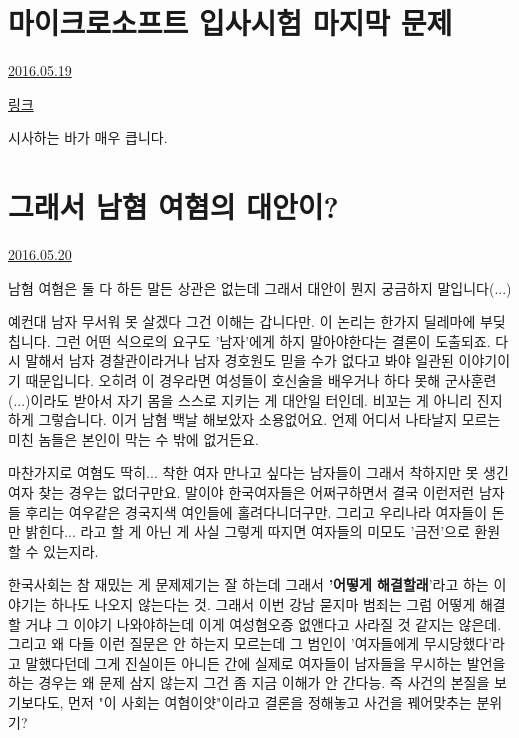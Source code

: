 \section{마이크로소프트 입사시험 마지막 문제}
\href{https://www.kockoc.com/Apoc/782086}{2016.05.19}

\vspace{5mm}

\href{http://news.chosun.com/site/data/html_dir/2016/05/18/2016051801367.html}{링크}
\vspace{5mm}

시사하는 바가 매우 큽니다.
\vspace{5mm}





\section{그래서 남혐 여혐의 대안이?}
\href{https://www.kockoc.com/Apoc/783930}{2016.05.20}

\vspace{5mm}

남혐 여혐은 둘 다 하든 말든 상관은 없는데
그래서 대안이 뭔지 궁금하지 말입니다(...)
\vspace{5mm}

예컨대 남자 무서워 못 살겠다 그건 이해는 갑니다만.
이 논리는 한가지 딜레마에 부딪칩니다.
그런 어떤 식으로의 요구도 '남자'에게 하지 말아야한다는 결론이 도출되죠.
다시 말해서 남자 경찰관이라거나 남자 경호원도 믿을 수가 없다고 봐야 일관된 이야기이기 때문입니다.
오히려 이 경우라면 여성들이 호신술을 배우거나 하다 못해 군사훈련(...)이라도 받아서 자기 몸을 스스로 지키는 게 대안일 터인데.
비꼬는 게 아니리 진지하게 그렇습니다. 이거 남혐 백날 해보았자 소용없어요.
언제 어디서 나타날지 모르는 미친 놈들은 본인이 막는 수 밖에 없거든요.
\vspace{5mm}

마찬가지로 여혐도 딱히... 착한 여자 만나고 싶다는 남자들이 그래서 착하지만 못 생긴 여자 찾는 경우는 없더구만요.
말이야 한국여자들은 어쩌구하면서 결국 이런저런 남자들 후리는 여우같은 경국지색 여인들에 홀려다니더구만.
그리고 우리나라 여자들이 돈만 밝힌다... 라고 할 게 아닌 게 사실 그렇게 따지면 여자들의 미모도 '금전'으로 환원할 수 있는지라.
\vspace{5mm}

한국사회는 참 재밌는 게 문제제기는 잘 하는데 그래서 \textbf{'어떻게 해결할래}'라고 하는 이야기는 하나도 나오지 않는다는 것.
그래서 이번 강남 묻지마 범죄는 그럼 어떻게 해결할 거냐 그 이야기 나와야하는데 이게 여성혐오증 없앤다고 사라질 것 같지는 않은데.
그리고 왜 다들 이런 질문은 안 하는지 모르는데 그 범인이 '여자들에게 무시당했다'라고 말했다던데
그게 진실이든 아니든 간에 실제로 여자들이 남자들을 무시하는 발언을 하는 경우는 왜 문제 삼지 않는지 그건 좀 지금 이해가 안 간다능.
즉 사건의 본질을 보기보다도, 먼저 "이 사회는 여혐이얏"이라고 결론을 정해놓고 사건을 꿰어맞추는 분위기?
\vspace{5mm}

